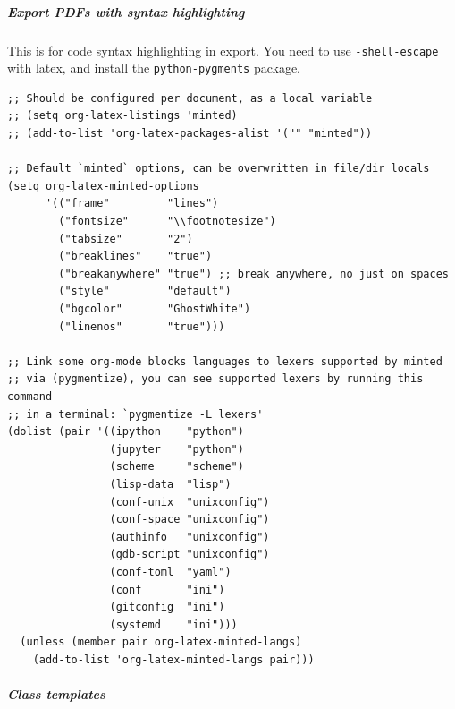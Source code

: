 \documentclass[11pt]{article}
\begin{document}
\subparagraph{Export PDFs with syntax highlighting}
\label{sec:org540d88f}
This is for code syntax highlighting in export. You need to use \texttt{-shell-escape}
with latex, and install the \texttt{python-pygments} package.

\begin{verbatim}
;; Should be configured per document, as a local variable
;; (setq org-latex-listings 'minted)
;; (add-to-list 'org-latex-packages-alist '("" "minted"))

;; Default `minted` options, can be overwritten in file/dir locals
(setq org-latex-minted-options
      '(("frame"         "lines")
        ("fontsize"      "\\footnotesize")
        ("tabsize"       "2")
        ("breaklines"    "true")
        ("breakanywhere" "true") ;; break anywhere, no just on spaces
        ("style"         "default")
        ("bgcolor"       "GhostWhite")
        ("linenos"       "true")))

;; Link some org-mode blocks languages to lexers supported by minted
;; via (pygmentize), you can see supported lexers by running this command
;; in a terminal: `pygmentize -L lexers'
(dolist (pair '((ipython    "python")
                (jupyter    "python")
                (scheme     "scheme")
                (lisp-data  "lisp")
                (conf-unix  "unixconfig")
                (conf-space "unixconfig")
                (authinfo   "unixconfig")
                (gdb-script "unixconfig")
                (conf-toml  "yaml")
                (conf       "ini")
                (gitconfig  "ini")
                (systemd    "ini")))
  (unless (member pair org-latex-minted-langs)
    (add-to-list 'org-latex-minted-langs pair)))
\end{verbatim}

\subparagraph{Class templates}
\label{sec:org8902137}
\end{document}
